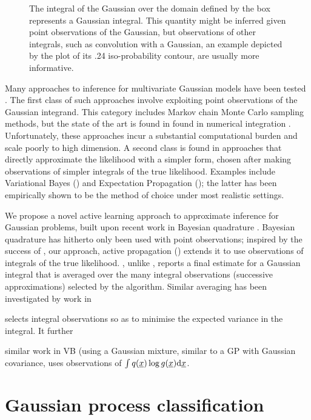 \documentclass[twoside]{article}
\begin{document}
\begin{figure}
\caption{The integral of the Gaussian over the domain defined by the box represents a Gaussian integral. This quantity might be inferred given point observations of the Gaussian, but observations of other integrals, such as convolution with a Gaussian, an example depicted by the plot of its .24 iso-probability contour, are usually more informative.}
\label{fig:observations}
\end{figure}

Many approaches to inference for multivariate Gaussian models have been tested \citep{kuss2005assessing}. The first class of such approaches involve exploiting point observations of the Gaussian integrand. This category includes Markov chain Monte Carlo sampling methods, but the state of the art is found in found in numerical integration \citep{genz2009computation}. Unfortunately, these approaches incur a substantial computational burden and scale poorly to high dimension. A second class is found in approaches that directly approximate the likelihood with a simpler form, chosen after making observations of simpler integrals of the true likelihood. Examples include Variational Bayes (\vb) and Expectation Propagation \citep{minka2001expectation} (\ep); the latter has been empirically shown to be the method of choice \citep{nickisch2008approximations} under most realistic settings. 

We propose a novel active learning approach to approximate inference for Gaussian problems, built upon recent work in Bayesian quadrature \citep{osborne2012active}. Bayesian quadrature has hitherto only been used with point observations; inspired by the success of \ep, our approach, active propagation (\ap) extends it to use observations of integrals of the true likelihood. \ap, unlike \ep, reports a final estimate for a Gaussian integral that is averaged over the many integral observations (successive approximations) selected by the algorithm. Similar averaging has been investigated by work in \vb \citep{gershman2012nonparametric} 

selects integral observations so as to minimise the expected variance in the integral. It further

similar work in VB 
(using a Gaussian mixture, similar to a GP with Gaussian covariance, uses observations of $\int q(\underline{\smash{x}}) \log g(\underline{\smash{x}}) \mathrm{d}\underline{\smash{x}}$.





\section{Gaussian process classification}
\end{document}
